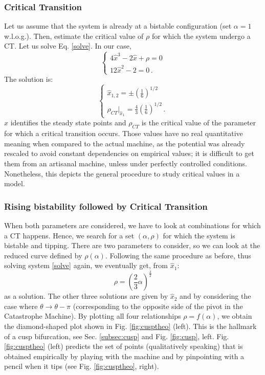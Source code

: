 \subsubsection{Critical Transition}
Let us assume that the system is already at a bistable configuration (set $\alpha = 1$ w.l.o.g.). Then, estimate the critical value of $\rho$ for which the system undergo a \gls{CT}. Let us solve Eq. \ref{solve}. In our case, 
\begin{equation}
	\begin{cases} 4\hat{x}^3 - 2\hat{x} + \rho = 0 \\ 12\hat{x}^2 - 2= 0 \, .\end{cases} 
\end{equation}
The solution is:
\begin{equation}
	\begin{cases} \hat{x}_{1,2}=\pm\left(\frac{1}{6} \right)^{1/2} \\ \rho_{CT}|_{\hat{x}_1} = \frac{4}{3}\left(\frac{1}{6}\right)^{1/2} \, . \end{cases} 
\end{equation}
$\hat{x}$ identifies the steady state points and $\rho_{CT}$ is the critical value of the parameter for which a critical transition occurs. Those values have no real quantitative meaning when compared to the actual machine, as the potential was already rescaled to avoid constant dependencies on empirical values; it is difficult to get them from an artisanal machine, unless under perfectly controlled conditions. Nonetheless, this depicts the general procedure to study critical values in a model.



\subsubsection{Rising bistability followed by Critical Transition}
When both parameters are considered, we have to look at combinations for which a CT happens. Hence, we search for a set $(\alpha, \rho)$ for which the system is bistable and tipping. There are two parameters to consider, so we can look at the reduced curve \citep{kuehn2013mathematical} defined by $\rho(\alpha)$. Following the same procedure as before, thus solving system \ref{solve} again, we eventually get, from $\hat{x}_1$:
\begin{equation}
	\rho = \left( \frac{2}{3}\alpha \right)^{\frac{3}{2}}
\end{equation}
as a solution. The other three solutions are given by $\hat{x}_2$ and by considering the case where $\theta \rightarrow \theta - \pi$ (corresponding to the opposite side of the pivot in the Catastrophe Machine). By plotting all four relationships $\rho = f(\alpha)$, we obtain the diamond-shaped plot shown in Fig. \ref{fig:cusptheo} (left). This is the hallmark of a cusp bifurcation, see Sec. \ref{subsec:cusp} and Fig. \ref{fig:cusp}, left. Fig. \ref{fig:cusptheo} (left) predicts the set of points (qualitatively speaking) that is obtained empirically by playing with the machine and by pinpointing with a pencil when it tips (see Fig. \ref{fig:cusptheo}, right).


